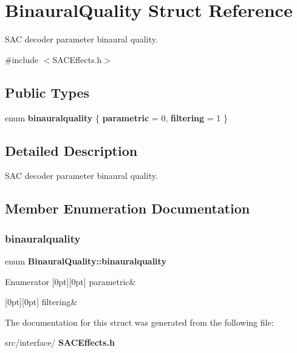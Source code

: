 \section{Binaural\+Quality Struct Reference}
\label{struct_binaural_quality}


S\+AC decoder parameter binaural quality.  




{\ttfamily \#include $<$S\+A\+C\+Effects.\+h$>$}

\subsection*{Public Types}
\begin{DoxyCompactItemize}
\item 
enum \textbf{ binauralquality} \{ \textbf{ parametric} = 0, 
\textbf{ filtering} = 1
 \}
\end{DoxyCompactItemize}


\subsection{Detailed Description}
S\+AC decoder parameter binaural quality. 

\subsection{Member Enumeration Documentation}
\mbox{\label{struct_binaural_quality_a3a009a287684c778dbb5507226cf24e4}} 
\subsubsection{binauralquality}
{\footnotesize\ttfamily enum \textbf{ Binaural\+Quality\+::binauralquality}}

\begin{DoxyEnumFields}{Enumerator}
[0pt][0pt]{}\mbox{\label{struct_binaural_quality_a3a009a287684c778dbb5507226cf24e4ae3a48f1342d8b4ee9527c620af1c0f7b}} 
parametric&\\
\hline

[0pt][0pt]{}\mbox{\label{struct_binaural_quality_a3a009a287684c778dbb5507226cf24e4a4f6f52196ab75b6d1b20df0d796807fc}} 
filtering&\\
\hline

\end{DoxyEnumFields}


The documentation for this struct was generated from the following file\+:\begin{DoxyCompactItemize}
\item 
src/interface/\textbf{ S\+A\+C\+Effects.\+h}\end{DoxyCompactItemize}
